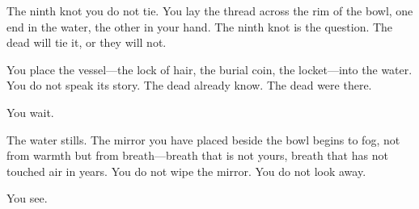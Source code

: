 The ninth knot you do not tie. You lay the thread across the rim of the bowl, one end in the water, the other in your hand. The ninth knot is the question. The dead will tie it, or they will not.

You place the vessel---the lock of hair, the burial coin, the locket---into the water. You do not speak its story. The dead already know. The dead were there.

You wait.

The water stills. The mirror you have placed beside the bowl begins to fog, not from warmth but from breath---breath that is not yours, breath that has not touched air in years. You do not wipe the mirror. You do not look away.

You see.

\vspace{1em}

